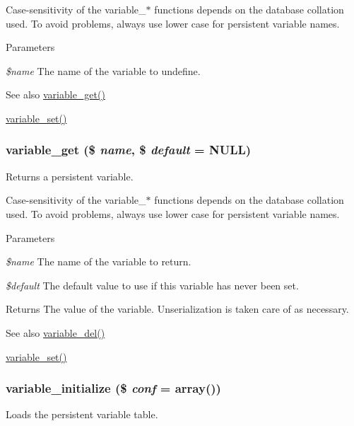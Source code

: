Case-\/sensitivity of the variable\_\-$\ast$ functions depends on the database collation used. To avoid problems, always use lower case for persistent variable names.


\begin{DoxyParams}{Parameters}
\item[{\em \$name}]The name of the variable to undefine.\end{DoxyParams}
\begin{DoxySeeAlso}{See also}
\hyperlink{bootstrap_8inc_a1be2160d5e5a1a9b9a0c90944c4f5252}{variable\_\-get()} 

\hyperlink{bootstrap_8inc_a9859faa6fcd56ca6048be93dace95999}{variable\_\-set()} 
\end{DoxySeeAlso}
\hypertarget{bootstrap_8inc_a1be2160d5e5a1a9b9a0c90944c4f5252}{
\subsubsection[{variable\_\-get}]{\setlength{\rightskip}{0pt plus 5cm}variable\_\-get (\$ {\em name}, \/  \$ {\em default} = {\ttfamily NULL})}}
\label{bootstrap_8inc_a1be2160d5e5a1a9b9a0c90944c4f5252}
Returns a persistent variable.

Case-\/sensitivity of the variable\_\-$\ast$ functions depends on the database collation used. To avoid problems, always use lower case for persistent variable names.


\begin{DoxyParams}{Parameters}
\item[{\em \$name}]The name of the variable to return. \item[{\em \$default}]The default value to use if this variable has never been set.\end{DoxyParams}
\begin{DoxyReturn}{Returns}
The value of the variable. Unserialization is taken care of as necessary.
\end{DoxyReturn}
\begin{DoxySeeAlso}{See also}
\hyperlink{bootstrap_8inc_a7850bff5f313f85335f418e6d87606b1}{variable\_\-del()} 

\hyperlink{bootstrap_8inc_a9859faa6fcd56ca6048be93dace95999}{variable\_\-set()} 
\end{DoxySeeAlso}
\hypertarget{bootstrap_8inc_a7cb710899d7238be1cad274e278cd87f}{
\subsubsection[{variable\_\-initialize}]{\setlength{\rightskip}{0pt plus 5cm}variable\_\-initialize (\$ {\em conf} = {\ttfamily array()})}}
\label{bootstrap_8inc_a7cb710899d7238be1cad274e278cd87f}
Loads the persistent variable table.

